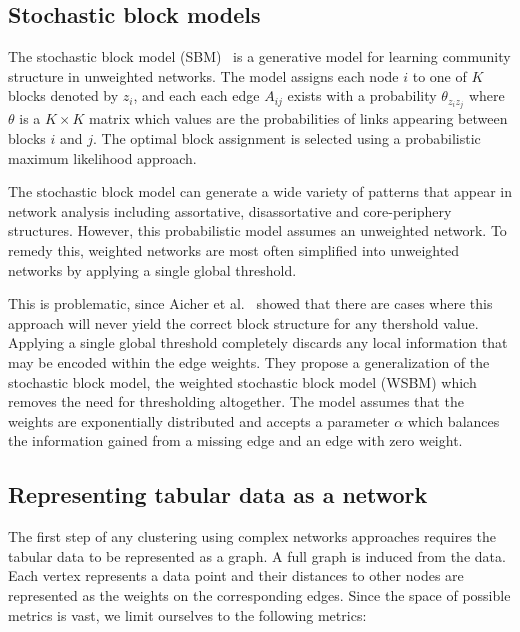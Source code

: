 \documentclass[conference]{IEEEtran}
\begin{document}
\subsection{Stochastic block models}

The stochastic block model (SBM)~\cite{holland1983stochastic} is a generative model for learning community structure in unweighted networks. The model assigns each node $i$ to one of $K$ blocks denoted by $z_i$, and each each edge $A_{ij}$ exists with a probability $\theta_{z_i z_j}$ where $\theta$ is a $K \times K$ matrix which values are the probabilities of links appearing between blocks $i$ and $j$. The optimal block assignment is selected using a probabilistic maximum likelihood approach.

The stochastic block model can generate a wide variety of patterns that appear in network analysis including assortative, disassortative and core-periphery structures. However, this probabilistic model assumes an unweighted network. To remedy this, weighted networks are most often simplified into unweighted networks by applying a single global threshold.

This is problematic, since Aicher et al.~\cite{aicher2013adapting} showed that there are cases where this approach will never yield the correct block structure for any thershold value. Applying a single global threshold completely discards any local information that may be encoded within the edge weights. They propose a generalization of the stochastic block model, the weighted stochastic block model (WSBM) which removes the need for thresholding altogether. The model assumes that the weights are exponentially distributed and accepts a parameter $\alpha$ which balances the information gained from a missing edge and an edge with zero weight.

\subsection{Representing tabular data as a network}

The first step of any clustering using complex networks approaches requires the tabular data to be represented as a graph. A full graph is induced from the data. Each vertex represents a data point and their distances to other nodes are represented as the weights on the corresponding edges. Since the space of possible metrics is vast, we limit ourselves to the following metrics:
\end{document}
